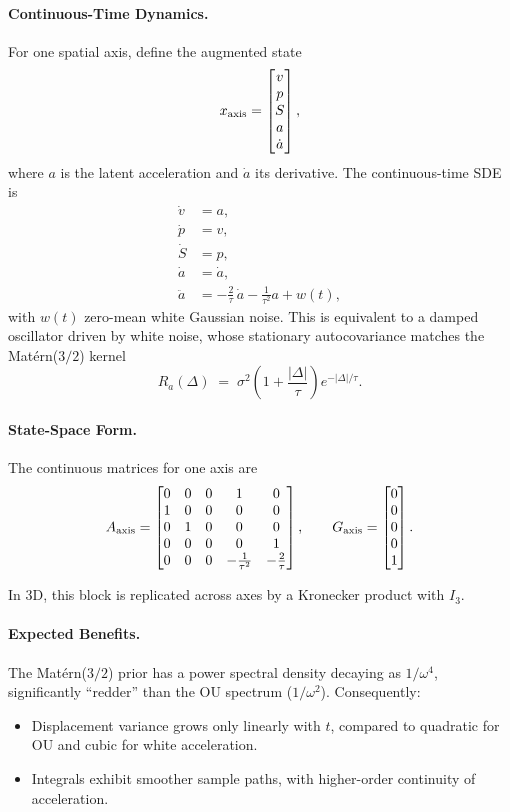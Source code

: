 \documentclass[10pt]{extarticle}
\begin{document}
\paragraph{Continuous-Time Dynamics.}
For one spatial axis, define the augmented state
\[
x_{\rm axis} =
\begin{bmatrix}
v \\ p \\ S \\ a \\ \dot a
\end{bmatrix},
\]
where $a$ is the latent acceleration and $\dot a$ its derivative. The continuous-time SDE is
\begin{align}
\dot v &= a, \\
\dot p &= v, \\
\dot S &= p, \\
\dot a &= \dot a, \\
\ddot a &= -\tfrac{2}{\tau}\,\dot a - \tfrac{1}{\tau^2} a + w(t),
\end{align}
with $w(t)$ zero-mean white Gaussian noise. This is equivalent to a damped oscillator driven by
white noise, whose stationary autocovariance matches the Mat\'ern($3/2$) kernel
\[
R_a(\Delta) \;=\; \sigma^2 \left(1 + \frac{|\Delta|}{\tau}\right)e^{-|\Delta|/\tau}.
\]

\paragraph{State-Space Form.}
The continuous matrices for one axis are
\[
A_{\rm axis} =
\begin{bmatrix}
0 & 0 & 0 & 1 & 0 \\
1 & 0 & 0 & 0 & 0 \\
0 & 1 & 0 & 0 & 0 \\
0 & 0 & 0 & 0 & 1 \\
0 & 0 & 0 & -\tfrac{1}{\tau^2} & -\tfrac{2}{\tau}
\end{bmatrix},
\qquad
G_{\rm axis} =
\begin{bmatrix}0\\0\\0\\0\\1\end{bmatrix}.
\]

In 3D, this block is replicated across axes by a Kronecker product with $I_3$.

\paragraph{Expected Benefits.}
The Mat\'ern($3/2$) prior has a power spectral density decaying as $1/\omega^4$,
significantly ``redder'' than the OU spectrum ($1/\omega^2$). Consequently:
\begin{itemize}
\item Displacement variance grows only linearly with $t$, compared to quadratic for OU and cubic for white acceleration.
\item Integrals exhibit smoother sample paths, with higher-order continuity of acceleration.
\end{itemize}
\end{document}
